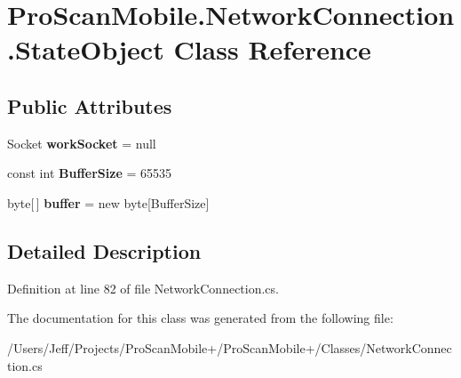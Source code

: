 \hypertarget{class_pro_scan_mobile_1_1_network_connection_1_1_state_object}{\section{Pro\-Scan\-Mobile.\-Network\-Connection.\-State\-Object Class Reference}
\label{class_pro_scan_mobile_1_1_network_connection_1_1_state_object}
}
\subsection*{Public Attributes}
\begin{DoxyCompactItemize}
\item 
\hypertarget{class_pro_scan_mobile_1_1_network_connection_1_1_state_object_ad520e994b85670d04f24db5976720e3b}{Socket {\bfseries work\-Socket} = null}\label{class_pro_scan_mobile_1_1_network_connection_1_1_state_object_ad520e994b85670d04f24db5976720e3b}

\item 
\hypertarget{class_pro_scan_mobile_1_1_network_connection_1_1_state_object_a7dd7b0f84ec17a00ca03a0b53e9615c6}{const int {\bfseries Buffer\-Size} = 65535}\label{class_pro_scan_mobile_1_1_network_connection_1_1_state_object_a7dd7b0f84ec17a00ca03a0b53e9615c6}

\item 
\hypertarget{class_pro_scan_mobile_1_1_network_connection_1_1_state_object_aaa4a50080195b13f6a9a72edab38765d}{byte\mbox{[}$\,$\mbox{]} {\bfseries buffer} = new byte\mbox{[}Buffer\-Size\mbox{]}}\label{class_pro_scan_mobile_1_1_network_connection_1_1_state_object_aaa4a50080195b13f6a9a72edab38765d}

\end{DoxyCompactItemize}


\subsection{Detailed Description}


Definition at line 82 of file Network\-Connection.\-cs.



The documentation for this class was generated from the following file\-:\begin{DoxyCompactItemize}
\item 
/\-Users/\-Jeff/\-Projects/\-Pro\-Scan\-Mobile+/\-Pro\-Scan\-Mobile+/\-Classes/Network\-Connection.\-cs\end{DoxyCompactItemize}
